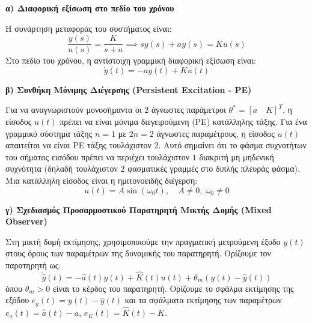 \documentclass[a4paper,11pt]{article}
\begin{document}
\begin{answer}
\textbf{α) Διαφορική εξίσωση στο πεδίο του χρόνου}

Η συνάρτηση μεταφοράς του συστήματος είναι:
\[
\frac{y(s)}{u(s)} = \frac{K}{s+a} \implies s y(s) + a y(s) = K u(s)
\]
Στο πεδίο του χρόνου, η αντίστοιχη γραμμική διαφορική εξίσωση είναι:
\[
\dot{y}(t) = -a y(t) + K u(t)
\]

\vspace{1em}
\textbf{β) Συνθήκη Μόνιμης Διέγερσης (Persistent Excitation - PE)}

Για να αναγνωριστούν μονοσήμαντα οι $2$ άγνωστες παράμετροι $\theta^* = [a \quad K]^T$, η είσοδος $u(t)$ πρέπει να είναι μόνιμα διεγειρούμενη (PE) κατάλληλης τάξης.
Για ένα γραμμικό σύστημα τάξης $n=1$ με $2n=2$ άγνωστες παραμέτρους, η είσοδος $u(t)$ απαιτείται να είναι PE τάξης τουλάχιστον $2$.
Αυτό σημαίνει ότι το φάσμα συχνοτήτων του σήματος εισόδου πρέπει να περιέχει τουλάχιστον $1$ διακριτή μη μηδενική συχνότητα (δηλαδή τουλάχιστον $2$ φασματικές γραμμές στο διπλής πλευράς φάσμα).
Μια κατάλληλη είσοδος είναι η ημιτονοειδής διέγερση:
\[
u(t) = A \sin(\omega_0 t), \quad A \neq 0, \ \omega_0 \neq 0
\]

\vspace{1em}
\textbf{γ) Σχεδιασμός Προσαρμοστικού Παρατηρητή Μικτής Δομής (Mixed Observer)}

Στη μικτή δομή εκτίμησης, χρησιμοποιούμε την πραγματική μετρούμενη έξοδο $y(t)$ στους όρους των παραμέτρων της δυναμικής του παρατηρητή. Ορίζουμε τον παρατηρητή ως:
\[
\dot{\hat{y}}(t) = -\hat{a}(t) y(t) + \hat{K}(t) u(t) + \theta_m \left( y(t) - \hat{y}(t) \right)
\]
όπου $\theta_m > 0$ είναι το κέρδος του παρατηρητή.
Ορίζουμε το σφάλμα εκτίμησης της εξόδου $e_y(t) = y(t) - \hat{y}(t)$ και τα σφάλματα εκτίμησης των παραμέτρων $e_a(t) = \hat{a}(t) - a$, $e_K(t) = \hat{K}(t) - K$.


\end{answer}
\end{document}
